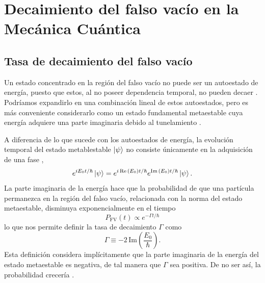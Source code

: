 \chapter{Decaimiento del falso vacío en la Mecánica Cuántica} 



\section{Tasa de decaimiento del falso vacío}

Un estado concentrado en la región del falso vacío no puede ser un autoestado de energía, puesto que estos, al no poseer dependencia temporal, no pueden decaer \cite{andreassen2017precision}. Podríamos expandirlo en una combinación lineal de estos autoestados, pero es más conveniente considerarlo como un estado fundamental metaestable cuya energía adquiere una parte imaginaria debido al tunelamiento  \cite{weinberg2012classical, paranjape2017theory, rubakov2009classical}. 

A diferencia de lo que sucede con los autoestados de energía, la evolución temporal del estado metablestable $\ket{\psi}$ no consiste únicamente en la adquisición de una fase \cite{kleinert2009path},
\begin{equation}
e^{iE_0 t/\hbar}\ket{\psi} = e^{i\Re\qty(E_0) t/\hbar}e^{\Im\qty(E_0) t/\hbar}\ket{\psi}.
\end{equation}
La parte imaginaria de la energía hace que la probabilidad de que una partícula permanezca en la región del falso vacío, relacionada con la norma del estado metaestable, disminuya exponencialmente en el tiempo 
\begin{equation} \label{eq:prob}
P_{\text{FV}}(t) \propto e^{-\Gamma t/\hbar}
\end{equation}
lo que nos permite definir la tasa de decaimiento $\Gamma$ como
\begin{equation}\label{eq:gammaE}
\Gamma \equiv -2 \, \mathrm{Im}\left(\frac{E_0}{\hbar}\right).
\end{equation} 
Esta definición considera implícitamente que la parte imaginaria de la energía del estado metaestable es negativa, de tal manera que $\Gamma$ sea positiva. De no ser así, la probabilidad crecería \cite{kleinert2009path}.%

